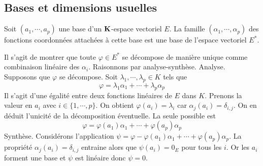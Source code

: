 \subsection{Bases et dimensions usuelles}
\label{BasesUsu}
\begin{propn} \label{basedual}
 Soit $(a_1,\cdots,a_p)$ une base d'un $\mathbf{K}$-espace vectoriel $E$. La famille $(\alpha_1,\cdots,\alpha_p)$ des fonctions coordonnées attachées à cette base est une base de l'espace vectoriel $E^*$.
\end{propn}
\begin{demo}
Il s'agit de montrer que toute $\varphi\in E^*$ se décompose de manière unique comme combinaison linéaire des $\alpha_i$. Raisonnons par analyse-synthèse.\newline
Analyse. Supposons que $\varphi$ se décompose. Soit $\lambda_1, \cdots, \lambda_p\in K$ tels que
\begin{displaymath}
 \varphi = \lambda_1\alpha_1+\cdots+\lambda_p\alpha_p
\end{displaymath}
Il s'agit d'une égalité entre deux fonctions linéaires de $E$ dans $K$. Prenons la valeur en $a_i$ avec $i\in\{1,\cdots,p\}$. On obtient $\varphi(a_i)=\lambda_i$ car $\alpha_j(a_i)=\delta_{i,j}$. On en déduit l'unicité de la décomposition éventuelle. La seule possible est
\begin{displaymath}
 \varphi = \varphi(a_1)\alpha_1+\cdots+\varphi(a_p)\alpha_p
\end{displaymath}
Synthèse. Considérons l'application $\psi = \varphi - \varphi(a_1)\alpha_1+\cdots+\varphi(a_p)\alpha_p$. La propriété $\alpha_j(a_i)=\delta_{i,j}$ entraine alors que $\psi(a_i)=0_E$ pour tous les $i$. Or les $a_i$ forment une base et $\psi$ est linéaire donc $\psi =0$.
\end{demo}

